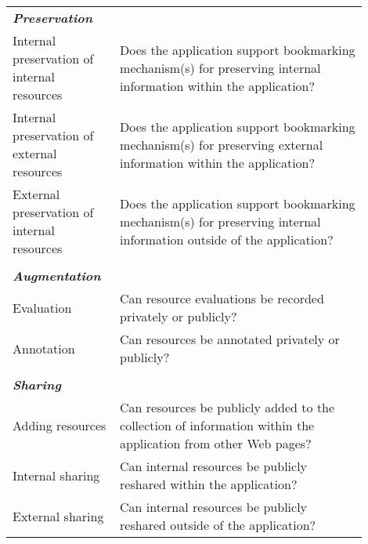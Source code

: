 \begin{table*}[htbp]
\begin{tabular}{|p{0.25\linewidth}|p{0.65\linewidth}|}
\emph{\textbf{Preservation}}                   &                                                                                                           \\
Internal preservation of internal resources       & Does the application support bookmarking mechanism(s) for preserving internal information within the application?        \\
Internal preservation of external resources       & Does the application support bookmarking mechanism(s) for preserving external information within the application?        \\
External preservation of internal resources      & Does the application support bookmarking mechanism(s) for preserving internal information outside of the application? \\ 
&\\
\emph{\textbf{Augmentation}}            &                                                                                                           \\
Evaluation                   & Can resource evaluations be recorded privately or publicly? \\
Annotation                   & Can resources be annotated privately or publicly?                                                                               \\    
 &\\      
\emph{\textbf{Sharing}}            &                                                                                                           \\
Adding resources             & Can resources be publicly added to the collection of information within the application from other Web pages?     \\
Internal sharing         & Can internal resources be publicly reshared within the application?         \\ 
External sharing          & Can internal resources be publicly reshared outside of the application?         \\ 
         
\hline
\end{tabular}
\end{table*}





